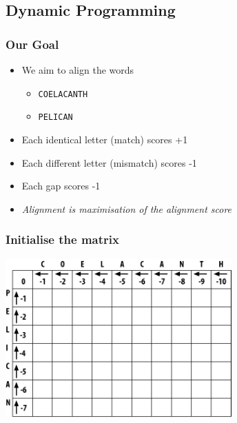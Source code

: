 %

\subsection{Dynamic Programming}
  \begin{frame}
  \frametitle{Our Goal}
  \begin{itemize}
    \item<1-> We aim to align the words
    \begin{itemize}
      \item<1-> \texttt{COELACANTH}
      \item<1-> \texttt{PELICAN}
    \end{itemize}
    \item<2-> Each identical letter (match) scores +1
    \item<2-> Each different letter (mismatch) scores -1
    \item<2-> Each gap scores -1
    \item<3-> \emph{Alignment is maximisation of the alignment score}
  \end{itemize}
\end{frame}   
   
\begin{frame}
  \frametitle{Initialise the matrix}
  \begin{center}
    \includegraphics[width=0.65\textwidth]{images/initialise}
    \end{center}
\end{frame}   
   
